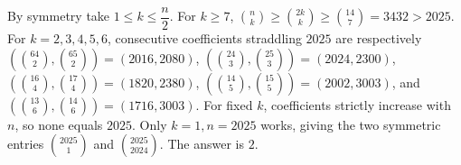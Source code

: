 By symmetry take $1\le k\le\dfrac{n}{2}$. For $k\ge7$, $\binom nk\ge\binom{2k}{k}\ge\binom{14}{7}=3432>2025$. For $k=2,3,4,5,6$, consecutive coefficients straddling $2025$ are respectively $(\binom{64}{2},\binom{65}{2})=(2016,2080)$, $(\binom{24}{3},\binom{25}{3})=(2024,2300)$, $(\binom{16}{4},\binom{17}{4})=(1820,2380)$, $(\binom{14}{5},\binom{15}{5})=(2002,3003)$, and $(\binom{13}{6},\binom{14}{6})=(1716,3003)$. For fixed $k$, coefficients strictly increase with $n$, so none equals $2025$. Only $k=1,n=2025$ works, giving the two symmetric entries $\binom{2025}{1}$ and $\binom{2025}{2024}$. The answer is $\boxed2$.
